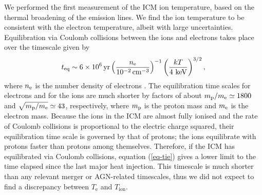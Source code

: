We performed the first measurement of the ICM ion temperature, based on the thermal broadening of the emission lines. We find the ion temperature to be consistent with the electron temperature, albeit with large uncertainties. Equilibration via Coulomb collisions between the ions and electrons takes place over the timescale given by
\begin{eqnarray}
t_{\rm eq} \sim  6 \times10^6 \,{\rm yr} \left(\frac{n_{\rm e}}{10^{-2}\,{\rm cm}^{-3}}\right)^{-1}\left(\frac{kT}{4 ~{\rm keV}}\right)^{3/2},
\label{eq-tie}
\end{eqnarray}
where $n_{\rm e}$ is the number density of electrons \citep{spitzer65,zeldovich66}. The equilibration time scales for electrons and for the ions are much shorter by factors of about $m_{\rm p}/m_{\rm e} \simeq 1800$ and $\sqrt{m_{\rm p}/m_{\rm e}} \simeq 43$, respectively, where $m_{\rm p}$ is the proton mass and $m_{\rm e}$ is the electron mass. Because the ions in the ICM are almost fully ionised and the rate of Coulomb collisions is proportional to the electric charge squared, their equilibration time scale is governed by that of protons; the ions equilibrate with protons faster than protons among themselves. Therefore, if the ICM has equilibrated via Coulomb collisions, equation (\ref{eq-tie}) gives a lower limit to the time elapsed since the last major heat injection. This timescale is much shorter than any relevant merger or AGN-related timescales, thus we did not expect to find a discrepancy between $T_\mathrm{e}$ and $T_\mathrm{ion}$.


